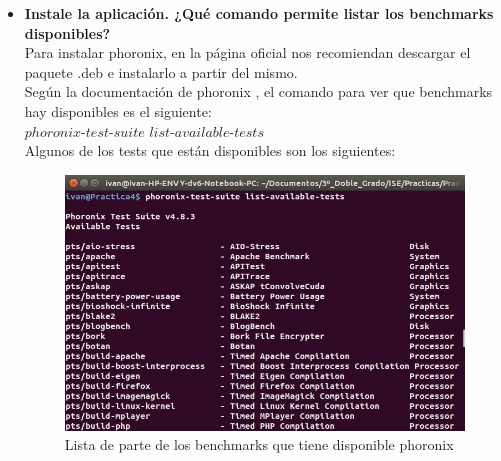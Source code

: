 \begin{itemize}
	\item \textbf{Instale la aplicación. ¿Qué comando permite listar los benchmarks disponibles?}\\
	Para instalar phoronix, en la página oficial nos recomiendan descargar el paquete .deb e instalarlo a partir del mismo\cite{phoronix-inst}.\\
	Según la documentación de phoronix \cite{phoronix}, el comando para ver que benchmarks hay disponibles es el siguiente:\\
	$phoronix$-$test$-$suite$ $list$-$available$-$tests$\\
	Algunos de los tests que están disponibles son los siguientes:\\
	\begin{figure}[H]
		\centering
		\includegraphics[width=0.7\linewidth]{phoronix-tests}
		\caption[phoronix-tests]{Lista de parte de los benchmarks que tiene disponible phoronix}
		\label{fig:phoronix-tests}
	\end{figure}
	

\end{itemize}
